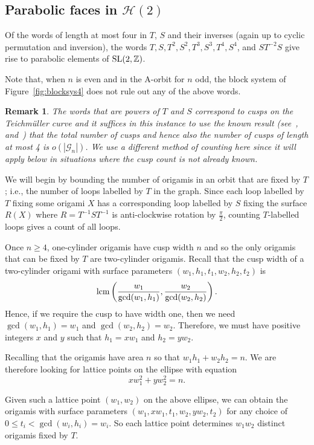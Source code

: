 \documentclass[a4paper,11pt]{amsart}
\numberwithin{equation}{section}
\numberwithin{figure}{section}
\numberwithin{table}{section}
\newtheorem{remark}[theorem]{Remark}
\newcommand{\teichmuller}{Teichm{\"u}ller }
\newcommand{\calH}{\mathcal{H}}
\newcommand{\Z}{\mathbb{Z}}
\newcommand{\cuspwidth}{{\rm{lcm}}\left(\frac{w_{1}}{\gcd(w_{1},h_{1})},\frac{w_{2}}{\gcd(w_{2},h_{2})}\right)}
\DeclareMathOperator{\SL}{{\rm{SL}}}
\begin{document}

\subsection{Parabolic faces in $\calH(2)$}\label{subsec:para-H2}

Of the words of length at most four in $T$, $S$ and their inverses (again up to cyclic permutation and inversion), the words $T, S, T^2, S^2, T^3, S^3, T^4, S^4$, and $ST^{-2}S$ give rise to parabolic elements of $\SL(2,\Z)$.

Note that, when $n$ is even and in the A-orbit for $n$ odd, the block system of Figure~\ref{fig:blocksys4} does not rule out any of the above words.
\begin{remark}\label{rem:cusps}
    The words that are powers of $T$ and $S$ correspond to cusps on the \teichmuller curve and it suffices in this instance to use the known result (see~\cite{McM},~\cite{Bai} and~\cite{Muk}) that the total number of cusps and hence also the number of cusps of length at most 4 is $o(|\mathcal{G}_{n}|)$. We use a different method of counting here since it will apply below in situations where the cusp count is not already known.
\end{remark}

We will begin by bounding the number of origamis in an orbit that are fixed by $T$; i.e., the number of loops labelled by $T$ in the graph. Since each loop labelled by $T$ fixing some origami $X$ has a corresponding loop labelled by $S$ fixing the surface $R(X)$ where $R = T^{-1}ST^{-1}$ is anti-clockwise rotation by $\frac{\pi}{2}$, counting $T$-labelled loops gives a count of all loops.

Once $n\geq 4$, one-cylinder origamis have cusp width $n$ and so the only origamis that can be fixed by $T$ are two-cylinder origamis. Recall that the cusp width of a two-cylinder origami with surface parameters $(w_1,h_1,t_1,w_2,h_2,t_2)$ is
\[\cuspwidth.\]
Hence, if we require the cusp to have width one, then we need $\gcd(w_{1},h_{1}) = w_{1}$ and $\gcd(w_{2},h_{2}) = w_{2}$. Therefore, we must have positive integers $x$ and $y$ such that $h_{1} = xw_{1}$ and $h_{2} = yw_{2}$.

Recalling that the origamis have area $n$ so that $w_{1}h_{1}+w_{2}h_{2} = n$. We are therefore looking for lattice points on the ellipse with equation
\[xw_{1}^{2} + yw_{2}^{2} = n.\]

Given such a lattice point $(w_{1},w_{2})$ on the above ellipse, we can obtain the origamis with surface parameters $(w_{1},xw_{1},t_1,w_{2},yw_{2},t_{2})$ for any choice of $0\leq t_{i} < \gcd(w_{i},h_{i}) = w_{i}$. So each lattice point determines $w_{1}w_{2}$ distinct origamis fixed by $T$.
\end{document}
